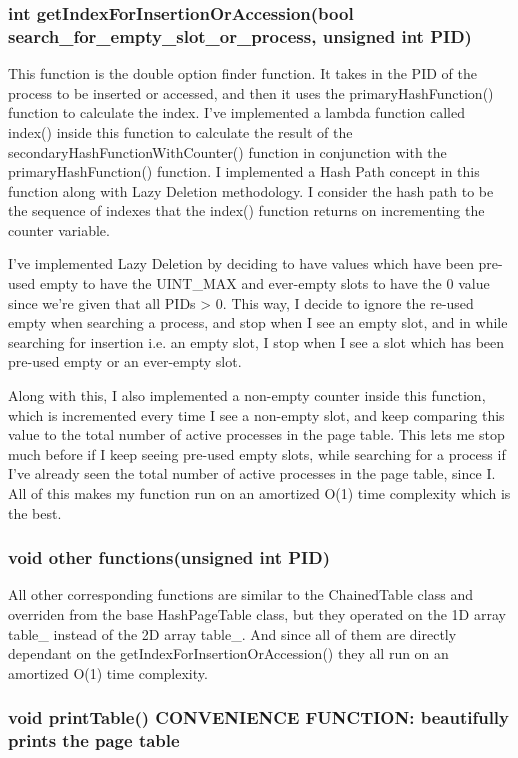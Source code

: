 \documentclass[a4paper]{article}
\begin{document}
    \subsubsection{{\color{orange}int} {\color{draculapurple}getIndexForInsertionOrAccession}({\color{orange}bool} search\_for\_empty\_slot\_or\_process, {\color{orange}unsigned int} PID)}
    This function is the double option finder function. It takes in the {\color{orange}PID} of the process to be inserted or accessed, and then it uses the {\color{draculapurple}primaryHashFunction()} function to calculate the index.
    I've implemented a {\color{GoldenYellow}lambda function} called {\color{draculapurple}index()} inside this function to calculate the result of the {\color{draculapurple}secondaryHashFunctionWithCounter()} function in conjunction with the {\color{draculapurple} primaryHashFunction()} function.
    I implemented a {\color{GoldenYellow} Hash Path concept} in this function along with {\color{GoldenYellow}Lazy Deletion}
    methodology. I consider the hash path to be the sequence of indexes that the {\color{draculapurple}index()} function returns on incrementing the {\color{orange}counter} variable.

    I've implemented Lazy Deletion by deciding to have values which have been pre-used empty to have the
            {\color{LimeGreen}UINT\_MAX} and ever-empty slots to have the {\color{LimeGreen}0} value since we're
    given that all PIDs > 0. This way, I decide to ignore the re-used empty when searching a process, and
    stop when I see an empty slot, and in while searching for insertion i.e. an empty slot, I stop when
    I see a slot which has been pre-used empty or an ever-empty slot.

    Along with this, I also implemented a non-empty counter inside this function, which is incremented every
    time I see a non-empty slot, and keep comparing this value to the total number of active processes in the
    page table. This lets me stop much before if I keep seeing pre-used empty slots, while searching for a
    process if I've already seen the total number of active processes in the page table, since I.
    All of this makes my function run on an amortized {\color{lightblue}O(1)} time complexity which is the best.

    \subsubsection{{\color{orange}void} {\color{draculapurple}other functions}({\color{orange}unsigned int} PID)}
    All other corresponding functions are similar to the {\color{draculapurple}ChainedTable} class and overriden from the base {\color{draculapurple}HashPageTable} class, but they
    operated on the 1D array {\color{Turquoise}table\_} instead of the 2D array {\color{Turquoise}table\_}.
    And since all of them are directly dependant on the {\color{draculapurple}getIndexForInsertionOrAccession()}
    they all run on an amortized {\color{lightblue}O(1)} time complexity.

    \subsubsection{{\color{orange}void} {\color{draculapurple}printTable}() {\color{Awesome}CONVENIENCE FUNCTION:} {\color{yellow}beautifully prints the page table}}
\end{document}
